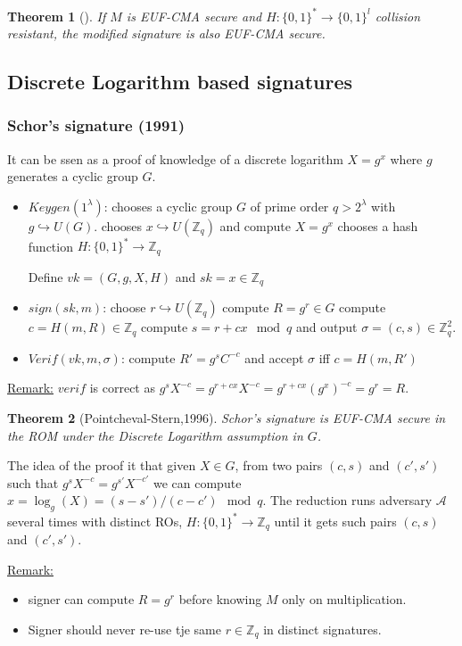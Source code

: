 \documentclass{article}
\newtheorem{thm}{Theorem}[section]
\newcommand{\Thm}[3]{\begin{thm}[#1]\label{#2}#3\end{thm}}
\newcommand{\Rem}{\underline{Remark:} }
\newcommand{\Z}{\mathbb{Z}}
\newcommand{\A}{\mathcal{A}}
\newcommand{\bit}{\{0,1\}}
\begin{document}
\Thm{}{}{If $M$ is EUF-CMA secure and $H:\bit^*\rightarrow\bit^l$ collision resistant, the modified signature is also EUF-CMA secure.}

\subsection{Discrete Logarithm based signatures}
\subsubsection{Schor's signature (1991)}
It can be ssen as a proof of knowledge of a discrete logarithm $X=g^x$ where $g$ generates a cyclic group $G$.
\begin{itemize}
\item $Keygen(1^\lambda)$:
\subitem chooses a cyclic group $G$ of prime order $q>2^\lambda$ with $g\hookrightarrow U(G)$.
\subitem chooses $x\hookrightarrow U(\Z_q)$ and compute $X=g^x$
\subitem chooses a hash function $H:\bit^*\rightarrow\Z_q$

Define $vk=(G,g,X,H)$ and $sk=x\in\Z_q$
\item $sign(sk,m)$:
\subitem choose $r\hookrightarrow U(\Z_q)$
\subitem compute $R=g^r\in G$
\subitem compute $c=H(m,R)\in\Z_q$
\subitem compute $s=r+cx\mod{q}$ and output $\sigma=(c,s)\in\Z_q^2$.

\item $Verif(vk,m,\sigma)$: compute $R'=g^sC^{-c}$ and accept $\sigma$ iff $c=H(m,R')$
\end{itemize}

\Rem $verif$ is correct as $g^sX^{-c}=g^{r+cx}X^{-c}=g^{r+cx}(g^x)^{-c}=g^r=R$.

\Thm{Pointcheval-Stern,1996}{}{Schor's signature is EUF-CMA secure in the ROM under the Discrete Logarithm assumption in $G$.}

The idea of the proof it that given $X\in G$, from two pairs $(c,s)$ and $(c',s')$ such that $g^sX^{-c}=g^{s'}X^{-c'}$ we can compute $x=\log_g(X) = (s-s')/(c-c')\mod{q}$. The reduction runs adversary $\A$ several times with distinct ROs, $H:\bit^*\rightarrow\Z_q$ until it gets such pairs $(c,s)$ and $(c',s')$.

\Rem \begin{itemize}
\item signer can compute $R=g^r$ before knowing $M$ only on multiplication.
\item Signer should never re-use tje same $r\in\Z_q$ in distinct signatures.
\end{itemize}
\end{document}
